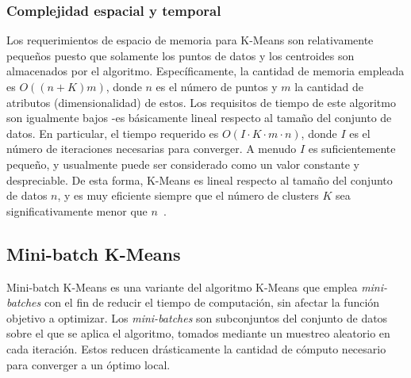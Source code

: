 \subsubsection{Complejidad espacial y temporal}

Los requerimientos de espacio de memoria para K-Means son relativamente pequeños puesto que solamente los puntos de datos y los centroides son almacenados por el algoritmo.
Específicamente, la cantidad de memoria empleada es $O((n+K)m)$, donde $n$ es el número de puntos y $m$ la cantidad de atributos (dimensionalidad) de estos.
Los requisitos de tiempo de este algoritmo son igualmente bajos -es básicamente lineal respecto al tamaño del conjunto de datos.
En particular, el tiempo requerido es $O(I \cdot K \cdot m \cdot n)$, donde $I$ es el número de iteraciones necesarias para converger.
A menudo $I$ es suficientemente pequeño, y usualmente puede ser considerado como un valor constante y despreciable.
De esta forma, K-Means es lineal respecto al tamaño del conjunto de datos $n$, y es muy eficiente siempre que el número de clusters $K$ sea significativamente menor que $n$~\cite{Tan05}.

%
%
%

\subsection{Mini-batch K-Means}\label{subsec:miniBatchKMeans}

Mini-batch K-Means es una variante del algoritmo K-Means que emplea \textit{mini-batches} con el fin de reducir el tiempo de computación, sin afectar la función objetivo a optimizar.
Los \textit{mini-batches} son subconjuntos del conjunto de datos sobre el que se aplica el algoritmo, tomados mediante un muestreo aleatorio en cada iteración.
Estos reducen drásticamente la cantidad de cómputo necesario para converger a un óptimo local.

